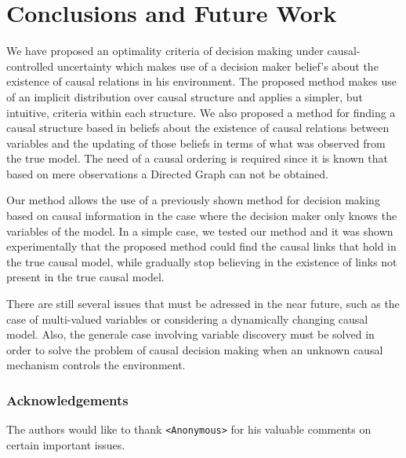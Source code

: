 \documentclass[letterpaper]{article}
\begin{document}
\section{Conclusions and Future Work}
We have proposed an optimality criteria of decision making under causal-controlled uncertainty which makes use of a decision maker belief's about the existence of causal relations in his environment. The proposed method makes use of an implicit distribution over causal structure and applies a simpler, but intuitive, criteria within each structure. We also proposed a method for finding a causal structure based in beliefs about the existence of causal relations between variables and the updating of those beliefs in terms of what was observed from the true model. The need of a causal ordering is required since it is known that based on mere observations a Directed Graph can not be obtained.

Our method allows the use of a previously shown method for decision making based on causal information in the case where the decision maker only knows the variables of the model. In a simple case, we tested our method and it was shown experimentally that the proposed method could find the causal links that hold in the true causal model, while gradually stop believing in the existence of links not present in the true causal model.

There are still several issues that must be adressed in the near future, such as the case of multi-valued variables or considering a dynamically changing causal model. Also, the generale case involving variable discovery must be solved in order to solve the problem of causal decision making when an unknown causal mechanism controls the environment. 

\subsubsection*{Acknowledgements}
The authors would like to thank \texttt{<Anonymous>} for his valuable comments on certain important issues.



\end{document}
